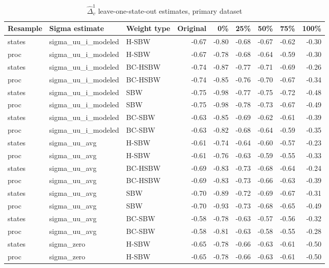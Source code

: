 \begin{table}[ht]
\centering
\label{tab:rdiffc1}
\caption{$\hat{\Delta}^1_v$ leave-one-state-out estimates, primary dataset}
\begin{tabular}{lllrrrrrr}
  \hline
Resample & Sigma estimate & Weight type & Original & 0\% & 25\% & 50\% & 75\% & 100\% \\ 
  \hline
states & sigma\_uu\_i\_modeled & H-SBW & -0.67 & -0.80 & -0.68 & -0.67 & -0.62 & -0.30 \\ 
  proc & sigma\_uu\_i\_modeled & H-SBW & -0.67 & -0.78 & -0.68 & -0.64 & -0.59 & -0.30 \\ 
  states & sigma\_uu\_i\_modeled & BC-HSBW & -0.74 & -0.87 & -0.77 & -0.71 & -0.69 & -0.26 \\ 
  proc & sigma\_uu\_i\_modeled & BC-HSBW & -0.74 & -0.85 & -0.76 & -0.70 & -0.67 & -0.34 \\ 
  states & sigma\_uu\_i\_modeled & SBW & -0.75 & -0.98 & -0.77 & -0.75 & -0.72 & -0.48 \\ 
  proc & sigma\_uu\_i\_modeled & SBW & -0.75 & -0.98 & -0.78 & -0.73 & -0.67 & -0.49 \\ 
  states & sigma\_uu\_i\_modeled & BC-SBW & -0.63 & -0.85 & -0.69 & -0.62 & -0.61 & -0.39 \\ 
  proc & sigma\_uu\_i\_modeled & BC-SBW & -0.63 & -0.82 & -0.68 & -0.64 & -0.59 & -0.35 \\ 
  states & sigma\_uu\_avg & H-SBW & -0.61 & -0.74 & -0.64 & -0.60 & -0.57 & -0.23 \\ 
  proc & sigma\_uu\_avg & H-SBW & -0.61 & -0.76 & -0.63 & -0.59 & -0.55 & -0.33 \\ 
  states & sigma\_uu\_avg & BC-HSBW & -0.69 & -0.83 & -0.73 & -0.68 & -0.64 & -0.24 \\ 
  proc & sigma\_uu\_avg & BC-HSBW & -0.69 & -0.83 & -0.73 & -0.66 & -0.63 & -0.39 \\ 
  states & sigma\_uu\_avg & SBW & -0.70 & -0.89 & -0.72 & -0.69 & -0.67 & -0.31 \\ 
  proc & sigma\_uu\_avg & SBW & -0.70 & -0.93 & -0.73 & -0.68 & -0.65 & -0.49 \\ 
  states & sigma\_uu\_avg & BC-SBW & -0.58 & -0.78 & -0.63 & -0.57 & -0.56 & -0.32 \\ 
  proc & sigma\_uu\_avg & BC-SBW & -0.58 & -0.81 & -0.63 & -0.58 & -0.55 & -0.28 \\ 
  states & sigma\_zero & H-SBW & -0.65 & -0.78 & -0.66 & -0.63 & -0.61 & -0.50 \\ 
  proc & sigma\_zero & H-SBW & -0.65 & -0.78 & -0.66 & -0.63 & -0.61 & -0.50 \\ 

\end{tabular}
\end{table}
